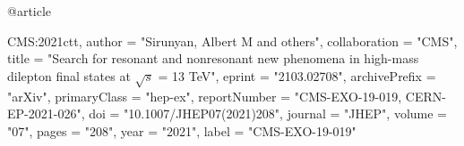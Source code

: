 @article{CMS:2021ctt,
    author = "Sirunyan, Albert M and others",
    collaboration = "CMS",
    title = "{Search for resonant and nonresonant new phenomena in high-mass dilepton final states at $ \sqrt{s} $ = 13 TeV}",
    eprint = "2103.02708",
    archivePrefix = "arXiv",
    primaryClass = "hep-ex",
    reportNumber = "CMS-EXO-19-019, CERN-EP-2021-026",
    doi = "10.1007/JHEP07(2021)208",
    journal = "JHEP",
    volume = "07",
    pages = "208",
    year = "2021",
    label = "CMS-EXO-19-019"

}

